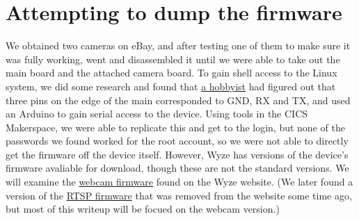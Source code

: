 \documentclass[a4paper, 11pt]{article}
\begin{document}
\section{Attempting to dump the firmware}
We obtained two cameras on eBay, and after testing one of them to make sure it was fully working, went and disassembled it until we were able to take out the main board and the attached camera board. 
To gain shell access to the Linux system, we did some research and found that \href{https://davidmac.pro/posts/2021-07-06-wyzecamv2-1-firmware/}{a hobbyist} had figured out that three pins on the edge of the main corresponded to GND, RX and TX, and used an Arduino to gain serial access to the device. Using tools in the CICS Makerspace, we were able to replicate this and get to the login, but none of the passwords we found worked for the root account, so we were not able to directly get the firmware off the device itself. However, Wyze has versions of the device's firmware avaliable for download, though these are not the standard versions. We will examine the \href{https://davidmac.pro/posts/2021-07-06-wyzecamv2-1-firmware/}{webcam firmware} found on the Wyze website. (We later found a version of the \href{https://archive.org/details/wyze_cam_rtsp_demo_bin}{RTSP firmware} that was removed from the website some time ago, but most of this writeup will be focued on the webcam version.)
\end{document}
